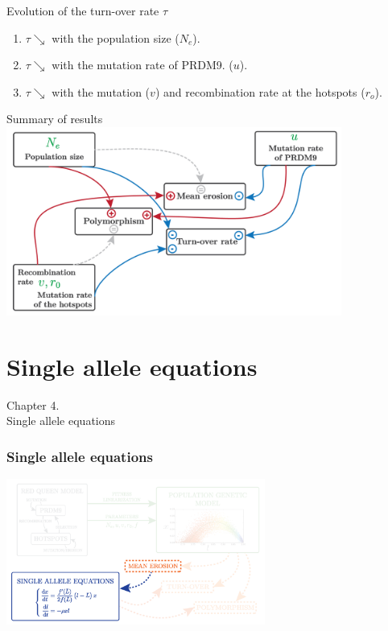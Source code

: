 \documentclass[10pt]{beamer}
\begin{document}
\begin{frame}
	\begin{center}
		\Large
    	Evolution of the turn-over rate $\tau$
	\end{center}
	\begin{enumerate}
		\item $\tau \searrow$ with the population size ($N_e$).
			
		\item $\tau \searrow$ with the mutation rate of PRDM9. ($u$).
		
		\item $\tau \searrow$ with the mutation ($v$) and recombination rate at the hotspots ($r_o$).
	\end{enumerate}
\end{frame}

\begin{frame}
	\begin{center}
		\Large
		Summary of results
       \includegraphics[width=11cm]{Images/summary.png}
	\end{center}
\end{frame}

\section{Single allele equations}

\begin{frame}
	\begin{center}
	\huge
	Chapter 4. \\
       Single allele equations
	\end{center}
\end{frame}

\begin{frame}
\frametitle{Single allele equations}
	\begin{center}
       \includegraphics[width=8.5cm]{Images/overline-4.png}
	\end{center}
\end{frame}
\end{document}
